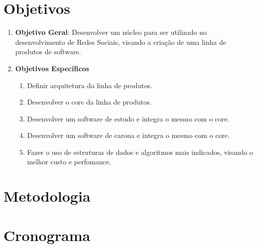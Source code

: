 \section*{Objetivos}

\begin{enumerate}
	\item \textbf{Objetivo Geral}: Desenvolver um núcleo para ser utilizado no desenvolvimento de Redes Sociais, visando a criação de uma linha de produtos de software.

	\item \textbf{Objetivos Específicos}
	\begin{enumerate}
		\item Definir arquitetura da linha de produtos.
		\item Desenvolver o core da linha de produtos.
		\item Desenvolver um software de estudo e integra o mesmo com o core.
		\item Desenvolver um software de carona e integra o mesmo com o core.
		\item Fazer o uso de estruturas de dados e algoritmos mais indicados, visando o melhor custo e perfomance.
	\end{enumerate}
\end{enumerate}
\section*{Metodologia}

\section*{Cronograma}

\postextual

 



